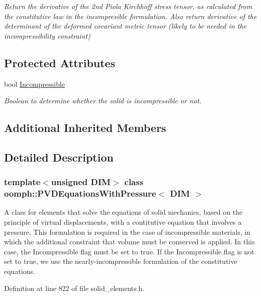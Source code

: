 \begin{DoxyCompactItemize}
\begin{DoxyCompactList}\small\item\em Return the derivative of the 2nd Piola Kirchhoff stress tensor, as calculated from the constitutive law in the incompresible formulation. Also return derivative of the determinant of the deformed covariant metric tensor (likely to be needed in the incompressibility constraint) \end{DoxyCompactList}\end{DoxyCompactItemize}
\subsection*{Protected Attributes}
\begin{DoxyCompactItemize}
\item 
bool \hyperlink{classoomph_1_1PVDEquationsWithPressure_aac3148726106893e282a4d400f24522b}{Incompressible}
\begin{DoxyCompactList}\small\item\em Boolean to determine whether the solid is incompressible or not. \end{DoxyCompactList}\end{DoxyCompactItemize}
\subsection*{Additional Inherited Members}


\subsection{Detailed Description}
\subsubsection*{template$<$unsigned D\+IM$>$\newline
class oomph\+::\+P\+V\+D\+Equations\+With\+Pressure$<$ D\+I\+M $>$}

A class for elements that solve the equations of solid mechanics, based on the principle of virtual displacements, with a contitutive equation that involves a pressure. This formulation is required in the case of incompressible materials, in which the additional constraint that volume must be conserved is applied. In this case, the Incompressible flag must be set to true. If the Incompressible flag is not set to true, we use the nearly-\/incompressible formulation of the constitutive equations. 

Definition at line 822 of file solid\+\_\+elements.\+h.



